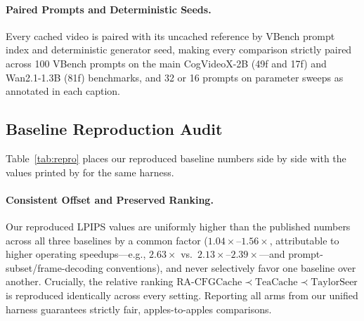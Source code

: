 \paragraph{Paired Prompts and Deterministic Seeds.}
Every cached video is paired with its uncached reference by VBench prompt index and deterministic generator seed, making every comparison strictly paired across 100 VBench prompts on the main CogVideoX-2B (49f and 17f) and Wan2.1-1.3B (81f) benchmarks, and 32 or 16 prompts on parameter sweeps as annotated in each caption.

\subsection{Baseline Reproduction Audit}
\label{app:baseline}

Table~\ref{tab:repro} places our reproduced baseline numbers side by side with the values printed by \citet{liu2026racfgcache} for the same harness.

\begin{table}[ht]
\centering\footnotesize\setlength{\tabcolsep}{3.2pt}
\caption{\textbf{Baseline reproduction audit} comparing numbers reported by \citet{liu2026racfgcache} against our reproduction using the released default configurations ($n=16$ diagnostic subset).}
\label{tab:repro}
\end{table}

\paragraph{Consistent Offset and Preserved Ranking.}
Our reproduced LPIPS values are uniformly higher than the published numbers across all three baselines by a common factor ($1.04\times\text{--}1.56\times$, attributable to higher operating speedups---e.g., $2.63\times$ vs.\ $2.13\times\text{--}2.39\times$---and prompt-subset/frame-decoding conventions), and never selectively favor one baseline over another. Crucially, the relative ranking $\text{RA-CFGCache} \prec \text{TeaCache} \prec \text{TaylorSeer}$ is reproduced identically across every setting. Reporting all arms from our unified harness guarantees strictly fair, apples-to-apples comparisons.
